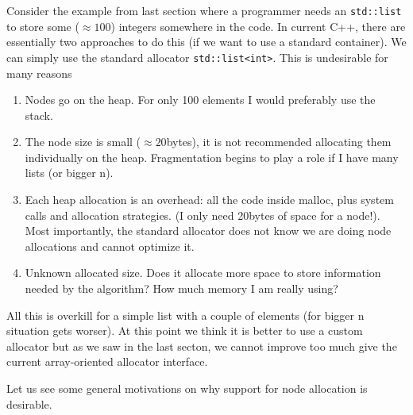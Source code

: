 \documentclass[11pt]{article}
\begin{document}
Consider the example from last section where a programmer needs an
\texttt{std::list} to store some ($\approx 100$) integers somewhere
in the code. In current C++, there are essentially two approaches to
do this (if we want to use a standard container). We can simply use
the standard allocator
\texttt{std::list<int>}.  This is undesirable for many reasons
\begin{enumerate}

\item Nodes go on the heap. For only 100 elements I would preferably
use the stack.

\item The node size is small ($\approx 20$bytes), it is not recommended
allocating them individually on the heap. Fragmentation begins to play a role
if I have many lists (or bigger n).

\item  Each heap allocation is an overhead: all the code inside malloc, plus
system calls and allocation strategies. (I only need 20bytes of space for a
node!). Most importantly, the standard allocator does not
know we are doing node allocations and cannot optimize it.

\item Unknown allocated size. Does it allocate more space to store information
needed by the algorithm? How much memory I am really using?

\end{enumerate}

All this is overkill for a simple list with a couple of elements
(for bigger n situation gets worser). At this point we think it is
better to use a custom allocator but as we saw in the last secton,
we cannot improve too much give the current array-oriented allocator
interface.

Let us see some general motivations on why support for node allocation is
desirable.
\end{document}
